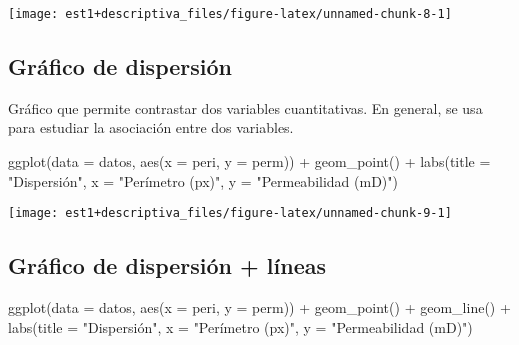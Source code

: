 \documentclass[
]{book}
\newenvironment{Shaded}{\begin{snugshade}}{\end{snugshade}}
\newcommand{\AttributeTok}[1]{\textcolor[rgb]{0.77,0.63,0.00}{#1}}
\newcommand{\FunctionTok}[1]{\textcolor[rgb]{0.00,0.00,0.00}{#1}}
\newcommand{\NormalTok}[1]{#1}
\newcommand{\SpecialCharTok}[1]{\textcolor[rgb]{0.00,0.00,0.00}{#1}}
\newcommand{\StringTok}[1]{\textcolor[rgb]{0.31,0.60,0.02}{#1}}
\theoremstyle{definition}
\theoremstyle{definition}
\theoremstyle{definition}
\theoremstyle{definition}
\theoremstyle{remark}
\begin{document}
\begin{center}\texttt{[image: est1+descriptiva\_files/figure-latex/unnamed-chunk-8-1]} \end{center}

\hypertarget{gruxe1fico-de-dispersiuxf3n}{%
\subsection*{Gráfico de dispersión}\label{gruxe1fico-de-dispersiuxf3n}}

Gráfico que permite contrastar dos variables cuantitativas. En general, se usa para estudiar la asociación entre dos variables.

\begin{Shaded}
\begin{Highlighting}[]
\FunctionTok{ggplot}\NormalTok{(}\AttributeTok{data =}\NormalTok{ datos, }\FunctionTok{aes}\NormalTok{(}\AttributeTok{x =}\NormalTok{ peri, }\AttributeTok{y =}\NormalTok{ perm)) }\SpecialCharTok{+}
  \FunctionTok{geom\_point}\NormalTok{() }\SpecialCharTok{+}
  \FunctionTok{labs}\NormalTok{(}\AttributeTok{title =} \StringTok{"Dispersión"}\NormalTok{, }\AttributeTok{x =} \StringTok{"Perímetro (px)"}\NormalTok{, }\AttributeTok{y =} \StringTok{"Permeabilidad (mD)"}\NormalTok{)}
\end{Highlighting}
\end{Shaded}

\begin{center}\texttt{[image: est1+descriptiva\_files/figure-latex/unnamed-chunk-9-1]} \end{center}

\hypertarget{gruxe1fico-de-dispersiuxf3n-luxedneas}{%
\subsection*{Gráfico de dispersión + líneas}\label{gruxe1fico-de-dispersiuxf3n-luxedneas}}

\begin{Shaded}
\begin{Highlighting}[]
\FunctionTok{ggplot}\NormalTok{(}\AttributeTok{data =}\NormalTok{ datos, }\FunctionTok{aes}\NormalTok{(}\AttributeTok{x =}\NormalTok{ peri, }\AttributeTok{y =}\NormalTok{ perm)) }\SpecialCharTok{+} 
  \FunctionTok{geom\_point}\NormalTok{() }\SpecialCharTok{+} 
  \FunctionTok{geom\_line}\NormalTok{() }\SpecialCharTok{+}
  \FunctionTok{labs}\NormalTok{(}\AttributeTok{title =} \StringTok{"Dispersión"}\NormalTok{, }\AttributeTok{x =} \StringTok{"Perímetro (px)"}\NormalTok{, }\AttributeTok{y =} \StringTok{"Permeabilidad (mD)"}\NormalTok{)}
\end{Highlighting}
\end{Shaded}
\end{document}
